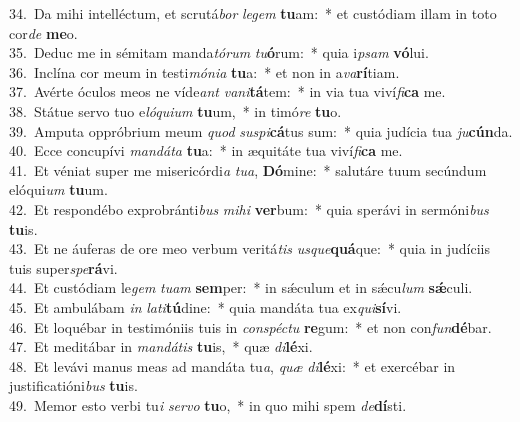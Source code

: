 {34.~}Da mihi intelléctum, et scrutá\textit{bor} \textit{le}\textit{gem} \textbf{tu}am:~* et custódiam illam in toto cor\textit{de} \textbf{me}o.\\
{35.~}Deduc me in sémitam manda\textit{tó}\textit{rum} \textit{tu}\textbf{ó}rum:~* quia i\textit{psam} \textbf{vó}lui.\\
{36.~}Inclína cor meum in testi\textit{mó}\textit{ni}\textit{a} \textbf{tu}a:~* et non in a\textit{va}\textbf{rí}tiam.\\
{37.~}Avérte óculos meos ne víde\textit{ant} \textit{va}\textit{ni}\textbf{tá}tem:~* in via tua viví\textit{fi}\textbf{ca} me.\\
{38.~}Státue servo tuo e\textit{ló}\textit{qui}\textit{um} \textbf{tu}um,~* in timó\textit{re} \textbf{tu}o.\\
{39.~}Amputa oppróbrium meum \textit{quod} \textit{su}\textit{spi}\textbf{cá}tus sum:~* quia judícia tua \textit{ju}\textbf{cún}da.\\
{40.~}Ecce concupívi \textit{man}\textit{dá}\textit{ta} \textbf{tu}a:~* in æquitáte tua viví\textit{fi}\textbf{ca} me.\\
{41.~}Et véniat super me misericórdi\textit{a} \textit{tu}\textit{a}, \textbf{Dó}mine:~* salutáre tuum secúndum elóqui\textit{um} \textbf{tu}um.\\
{42.~}Et respondébo exprobránti\textit{bus} \textit{mi}\textit{hi} \textbf{ver}bum:~* quia sperávi in sermóni\textit{bus} \textbf{tu}is.\\
{43.~}Et ne áuferas de ore meo verbum veritá\textit{tis} \textit{us}\textit{que}\textbf{quá}que:~* quia in judíciis tuis super\textit{spe}\textbf{rá}vi.\\
{44.~}Et custódiam le\textit{gem} \textit{tu}\textit{am} \textbf{sem}per:~* in sǽculum et in sǽcu\textit{lum} \textbf{sǽ}culi.\\
{45.~}Et ambulábam \textit{in} \textit{la}\textit{ti}\textbf{tú}dine:~* quia mandáta tua ex\textit{qui}\textbf{sí}vi.\\
{46.~}Et loquébar in testimóniis tuis in \textit{con}\textit{spé}\textit{ctu} \textbf{re}gum:~* et non con\textit{fun}\textbf{dé}bar.\\
{47.~}Et meditábar in \textit{man}\textit{dá}\textit{tis} \textbf{tu}is,~* quæ \textit{di}\textbf{lé}xi.\\
{48.~}Et levávi manus meas ad mandáta tu\textit{a}, \textit{quæ} \textit{di}\textbf{lé}xi:~* et exercébar in justificatióni\textit{bus} \textbf{tu}is.\\
{49.~}Memor esto verbi tu\textit{i} \textit{ser}\textit{vo} \textbf{tu}o,~* in quo mihi spem \textit{de}\textbf{dí}sti.\\
